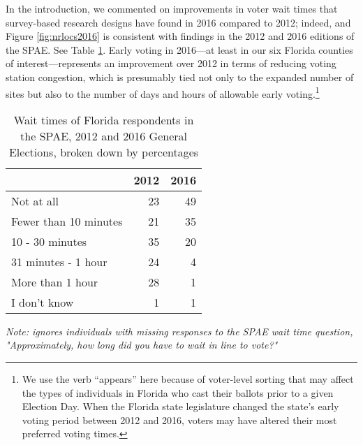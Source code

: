 \documentclass[12pt,titlepage]{article}
\begin{document}
In the introduction, we commented on improvements in voter wait times
that survey-based research designs have found in 2016 compared to
2012; indeed, and Figure \ref{fig:nrlocs2016} is consistent with
findings in the 2012 \citep{spae2012} and 2016 \citep{spae2016}
editions of the SPAE.  See Table \ref{tab:floridaspae}.  Early voting
in 2016---at least in our six Florida counties of
interest---represents an improvement over 2012 in terms of reducing
voting station congestion, which is presumably tied not only to the
expanded number of sites but also to the number of days and hours of
allowable early voting.\footnote{We use the verb ``appears'' here
  because of voter-level sorting that may affect the types of
  individuals in Florida who cast their ballots prior to a given
  Election Day.  When the Florida state legislature changed the
  state's early voting period between 2012 and 2016, voters may have
  altered their most preferred voting times.}

\begin{table}[ht]
\centering
\caption{Wait times of Florida respondents in the SPAE, 2012 and 2016
  General Elections, broken down by percentages} 
\label{tab:floridaspae}
\begin{tabular}{lrr}
  \hline
 & 2012 & 2016 \\ 
  \hline
  Not at all &  23 &  49 \\ 
  Fewer than 10 minutes &  21 &  35 \\ 
  10 - 30 minutes &  35 &  20 \\ 
  31 minutes - 1 hour &  24 &   4 \\ 
  More than 1 hour &  28 &   1 \\ 
  I don't know &   1 &   1 \\ 
   \hline
\end{tabular}
\begin{flushleft}
  \emph{Note: ignores individuals with missing responses to the SPAE
    wait time question, "Approximately, how long did you have to wait
    in line to vote?"}
\end{flushleft}
\end{table}

% 
\end{document}
